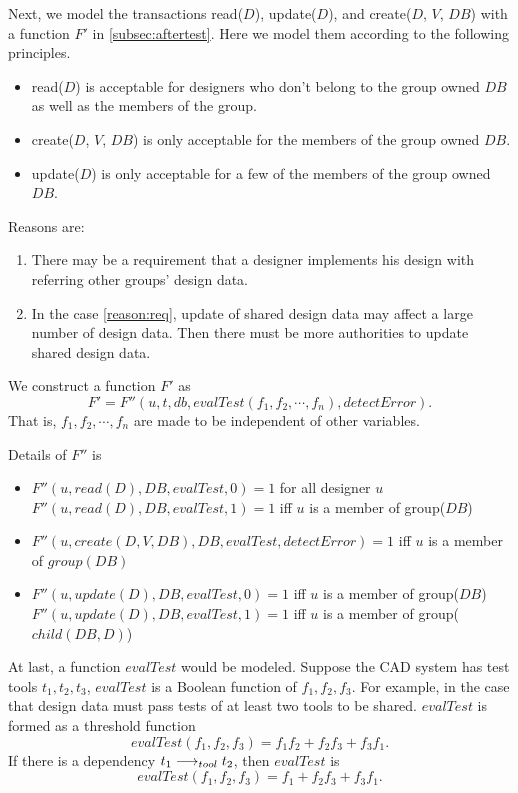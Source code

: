 Next, we model the transactions read($D$), update($D$), and create($D$, $V$,
$DB$) with a function $F'$ in \ref{subsec:aftertest}.
Here we model them according to the following principles.
\begin{itemize}
\item read($D$) is acceptable for designers who don't belong to the
group owned $DB$ as well as the members of the group.
\item create($D$, $V$, $DB$) is only acceptable for the members of the 
group owned $DB$.
\item update($D$) is only acceptable for a few of the members of the
group owned $DB$.
\end{itemize}
Reasons are:
\begin{enumerate}
\item{\label{reason:req}} There may be a requirement that a designer 
implements his design with referring other groups' design data.
\item In the case \ref{reason:req}, update of shared design data may affect
a large number of design data.
Then there must be more authorities to update shared design data. 
\end{enumerate}

We construct a function $F'$ as 
\[ F' = F''(u, t, db, evalTest(f_1, f_2, \cdots, f_n), detectError). \]
That is, $f_1, f_2, \cdots, f_n$ are made to be independent of other 
variables.

Details of $F''$ is
\begin{itemize}
\item $F''(u, read(D), DB, evalTest, 0) = 1$ for all designer $u$\\
$F''(u, read(D), DB, evalTest, 1) = 1$ iff $u$ is a member of group($DB$)
\item $F''(u, create(D, V, DB), DB, evalTest, detectError) = 1$ iff $u$ is a 
member of $group(DB)$
\item $F''(u, update(D), DB, evalTest, 0) = 1$ iff $u$ is a member of
group($DB$)\\
$F''(u, update(D), DB, evalTest, 1) = 1$ iff $u$ is a member of
group($child(DB, D)$) 
\end{itemize}

At last, a function $evalTest$ would be modeled.
Suppose the CAD system has test tools $t_1, t_2, t_3$, $evalTest$ is a
Boolean function of $f_1, f_2, f_3$.
For example, in the case that design data must pass tests
of at least two tools to be shared.
$evalTest$ is formed as a threshold function
\[ evalTest(f_1, f_2, f_3) = f_1f_2 + f_2f_3 + f_3f_1 .\]
If there is a \testtool dependency $t_1 \longrightarrow_{tool} t_2$, then
$evalTest$ is 
\[ evalTest(f_1, f_2, f_3) = f_1 + f_2f_3 + f_3f_1 .\]
